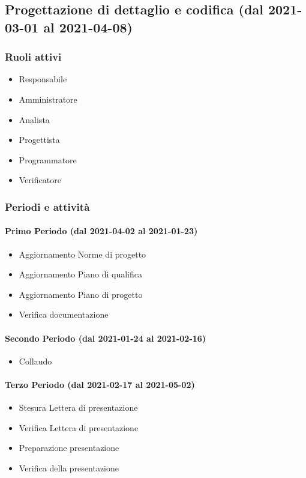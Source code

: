 \subsection{Progettazione di dettaglio e codifica (dal 2021-03-01 al 2021-04-08)}

\subsubsection{Ruoli attivi}
\begin{itemize}
	\item Responsabile
	\item Amministratore
	\item Analista
	\item Progettista
	\item Programmatore
	\item Verificatore
\end{itemize}

\subsubsection{Periodi e attività}

\paragraph{Primo Periodo (dal 2021-04-02 al 2021-01-23)}
\begin{itemize}
	\item Aggiornamento Norme di progetto
	\item Aggiornamento Piano di qualifica
	\item Aggiornamento Piano di progetto
	\item Verifica documentazione
\end{itemize}

\paragraph{Secondo Periodo (dal 2021-01-24 al 2021-02-16)}
\begin{itemize}
	\item Collaudo
\end{itemize}

\paragraph{Terzo Periodo (dal 2021-02-17 al 2021-05-02)}
\begin{itemize}
	\item Stesura Lettera di presentazione
	\item Verifica Lettera di presentazione
	\item Preparazione presentazione
	\item Verifica della presentazione
\end{itemize}

